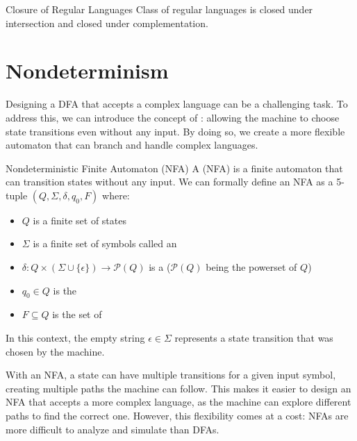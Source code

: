 \begin{thmbox}{Closure of Regular Languages}{}
    Class of regular languages is closed under intersection and closed under complementation.
\end{thmbox}

\section{Nondeterminism}

Designing a DFA that accepts a complex language can be a challenging task. To address this, we can introduce the concept of : allowing the machine to choose state transitions even without any input. By doing so, we create a more flexible automaton that can branch and handle complex languages.


\begin{dfnbox}{Nondeterministic Finite Automaton (NFA)}{}
    A  (NFA) is a finite automaton that can transition states without any input.
    \tcblower
    We can formally define an NFA as a 5-tuple $(Q, \Sigma, \delta, q_0, F)$ where:
    \begin{itemize}[noitemsep]
        \item $Q$ is a finite set of states
        \item $\Sigma$ is a finite set of symbols called an 
        \item $\delta : Q \times (\Sigma \cup \{ \epsilon\}) \to \mathcal{P}(Q)$ is a  ($\mathcal{P}(Q)$ being the powerset of $Q$)
        \item $q_0 \in Q$ is the 
        \item $F \subseteq Q$ is the set of 
    \end{itemize}
    In this context, the empty string $\epsilon \in \Sigma$ represents a state transition that was chosen by the machine.
\end{dfnbox}

With an NFA, a state can have multiple transitions for a given input symbol, creating multiple paths the machine can follow. This makes it easier to design an NFA that accepts a more complex language, as the machine can explore different paths to find the correct one. However, this flexibility comes at a cost: NFAs are more difficult to analyze and simulate than DFAs.

